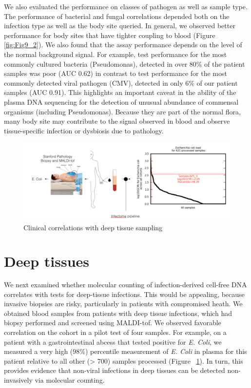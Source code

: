 We also evaluated the performance on classes of pathogen as well as sample type. The performance of bacterial and fungal correlations depended both on the infection type as well as the body site queried. In general, we observed better performance for body sites that have tighter coupling to blood (Figure \ref{fig:Fig9_2}). We also found that the assay performance depends on the level of the normal background signal. For example, test performance for the most commonly cultured bacteria (Pseudomonas), detected in over 80\% of the patient samples was poor (AUC 0.62) in contrast to test performance for the most commonly detected viral pathogen (CMV), detected in only 6\% of our patient samples (AUC 0.91). This highlights an important caveat in the ability of the plasma DNA sequencing for the detection of unusual abundance of commensal organisms (including Pseudomonas). Because they are part of the normal flora, many body site may contribute to the signal observed in blood and observe tissue-specific infection or dysbiosis due to pathology.

\begin{figure}
\center\includegraphics[width=150mm,scale=0.5]{Figures/Fig10}
\caption{Clinical correlations with deep tissue sampling}
\label{fig:Fig10}
\end{figure}

\section{Deep tissues}

We next examined whether molecular counting of infection-derived cell-free DNA correlates with tests for deep-tissue infections. This would be appealing, because invasive biopsies are risky, particularly in patients with compromised heath. We obtained blood samples from patients with deep tissue infections, which had biopsy performed and screened using MALDI-tof. We observed favorable correlation on the cohort in a pilot test of four samples. For example, on a patient with a gastrointestinal abcess  that tested positive for \emph{E. Coli}, we measured a very high ($98\%$) percentile measurement of  \emph{E. Coli} in plasma for this patient relative to all other (> 700) samples processed (Figure ~\ref{fig:Fig10}). In turn, this provides evidence that non-viral infections in deep tissues can be detected non-invasively via molecular counting.

